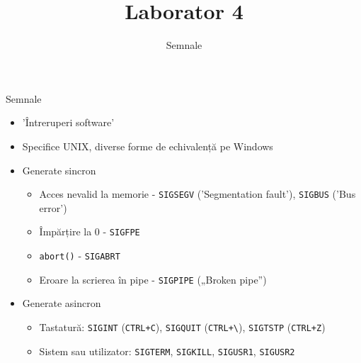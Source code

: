 \documentclass{so.cs.pub.ro}
\title[Laborator 4]{Laborator 4}
\subtitle{Semnale}
\begin{document}
\frame{\titlepage}

\begin{frame}{Semnale}
	\begin{itemize}    %
		\item 'Întreruperi software'
		\item Specifice UNIX, diverse forme de echivalență pe Windows
		\item Generate sincron
			\begin{itemize}
				\item Acces nevalid la memorie - \texttt{SIGSEGV} ('Segmentation fault'), \texttt{SIGBUS} ('Bus error')
				\item Împărțire la 0 - \texttt{SIGFPE}
				\item \texttt{abort()} - \texttt{SIGABRT}
				\item Eroare la scrierea în pipe - \texttt{SIGPIPE} („Broken pipe”)
			\end{itemize}
		\item Generate asincron
			\begin{itemize}
				\item Tastatură: \texttt{SIGINT}
(\texttt{CTRL+C}), \texttt{SIGQUIT} (\texttt{CTRL+\textbackslash}),
\texttt{SIGTSTP} (\texttt{CTRL+Z})

				\item Sistem sau utilizator: \texttt{SIGTERM}, \texttt{SIGKILL}, \texttt{SIGUSR1}, \texttt{SIGUSR2}
			\end{itemize}
	\end{itemize}
\end{frame}
\end{document}
